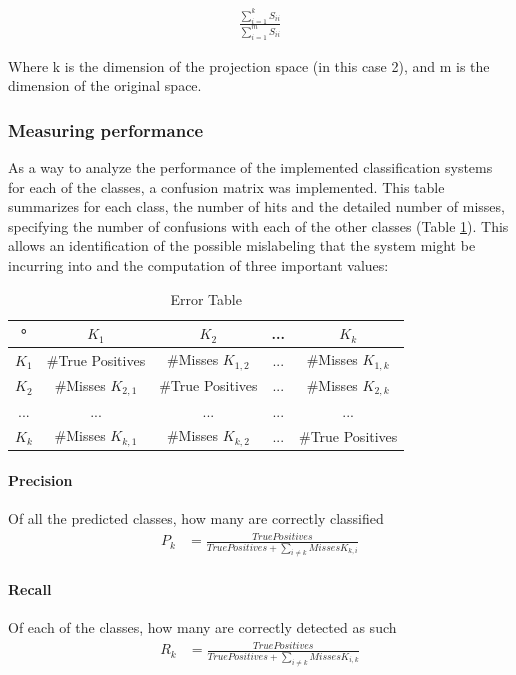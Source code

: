 \documentclass{IEEEtran}
\begin{document}
\begin{align}
\frac{\sum_{i=1}^{k}S_{ii}}{\sum_{i=1}^{m}S_{ii}} \label{eq:svderr}
\end{align}

Where k is the dimension of the projection space (in this case 2), and m is the dimension of the original space.

\subsubsection{Measuring performance}
\label{sub:measures}
As a way to analyze the performance of the implemented classification systems for each of the classes, 
a confusion matrix was implemented. 
This table summarizes for each class, the number of hits and the detailed number of misses, specifying 
the number of confusions with each of the other classes (Table \ref{tb:tbError}).
This allows an identification of the possible mislabeling that the system might be incurring into and
the computation of three important values:

\begin{table}
\centering
\begin{tabular}{|c | c | c| c| c|}
\hline
° &  $K_{1}$ &  $K_{2}$  & ... & $K_{k}$ \\
\hline
 $K_{1}$  & \#True Positives & \#Misses $K_{1,2}$ & ... & \#Misses $K_{1,k}$  \\
\hline
 $K_{2}$  & \#Misses $K_{2,1}$ & \#True Positives &  ... & \#Misses $K_{2,k}$  \\
\hline
... & ... & ... & ... & ... \\
\hline
 $K_{k}$  & \#Misses $K_{k,1}$ & \#Misses $K_{k,2}$ & ... & \#True Positives   \\
\hline
\end{tabular}
\caption{Error Table}
\label{tb:tbError}
\end{table}
 
\paragraph{Precision}  
Of all the predicted classes, how many are correctly classified 
\begin{align}
P_k &= \frac{True Positives}{True Positives + \sum_{i \ne k}{Misses K_{k,i}}} \label{eq:precision} 
\end{align}
\paragraph{Recall} 
Of each of the classes, how many are correctly detected as such 
\begin{align}
R_k &= \frac{True Positives}{True Positives + \sum_{i \ne k}{Misses K_{i,k}}} \label{eq:recall}
\end{align}
\end{document}
